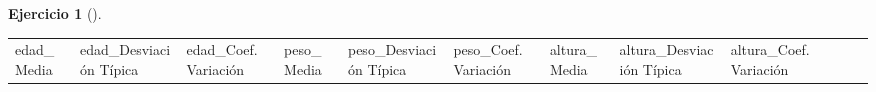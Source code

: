 \documentclass[
  a4paper,
]{scrreport}
\theoremstyle{definition}
\newtheorem{exercise}{Ejercicio}[chapter]
\theoremstyle{remark}
\begin{document}
\begin{exercise}[]
\begin{enumerate}
\begin{tcolorbox}
  \begin{longtable}[]{@{}
    >{\raggedleft\arraybackslash}p{}
    >{\raggedleft\arraybackslash}p{}
    >{\raggedleft\arraybackslash}p{}
    >{\raggedleft\arraybackslash}p{}
    >{\raggedleft\arraybackslash}p{}
    >{\raggedleft\arraybackslash}p{}
    >{\raggedleft\arraybackslash}p{}
    >{\raggedleft\arraybackslash}p{}
    >{\raggedleft\arraybackslash}p{}
    >{\raggedleft\arraybackslash}p{}
    >{\raggedleft\arraybackslash}p{}
    >{\raggedleft\arraybackslash}p{}@{}}
  \toprule\noalign{}
  \begin{minipage}[b]{\linewidth}\raggedleft
  edad\_Media
  \end{minipage} & \begin{minipage}[b]{\linewidth}\raggedleft
  edad\_Desviación Típica
  \end{minipage} & \begin{minipage}[b]{\linewidth}\raggedleft
  edad\_Coef. Variación
  \end{minipage} & \begin{minipage}[b]{\linewidth}\raggedleft
  peso\_Media
  \end{minipage} & \begin{minipage}[b]{\linewidth}\raggedleft
  peso\_Desviación Típica
  \end{minipage} & \begin{minipage}[b]{\linewidth}\raggedleft
  peso\_Coef. Variación
  \end{minipage} & \begin{minipage}[b]{\linewidth}\raggedleft
  altura\_Media
  \end{minipage} & \begin{minipage}[b]{\linewidth}\raggedleft
  altura\_Desviación Típica
  \end{minipage} & \begin{minipage}[b]{\linewidth}\raggedleft
  altura\_Coef. Variación
  \end{minipage} & \begin{minipage}[b]{\linewidth}\raggedleft

\end{minipage}
\end{longtable}
\end{tcolorbox}
\end{enumerate}
\end{exercise}
\end{document}
